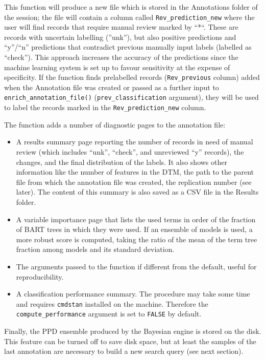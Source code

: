 \documentclass[
]{article}
\providecommand{\tightlist}{%
  \setlength{\itemsep}{0pt}\setlength{\parskip}{0pt}}
\begin{document}
This function will produce a new file which is stored in the Annotations
folder of the session; the file will contain a column called
\texttt{Rev\_prediction\_new} where the user will find records that
require manual review marked by ``*``. These are records with uncertain
labelling (''unk''), but also positive predictions and ``y''/``n''
predictions that contradict previous manually input labels (labelled as
``check''). This approach increases the accuracy of the predictions
since the machine learning system is set up to favour sensitivity at the
expense of specificity. If the function finds prelabelled records
(\texttt{Rev\_previous} column) added when the Annotation file was
created or passed as a further input to
\texttt{enrich\_annotation\_file()} (\texttt{prev\_classification}
argument), they will be used to label the records marked in the
\texttt{Rev\_prediction\_new} column.

The function adds a number of diagnostic pages to the annotation file:

\begin{itemize}
\tightlist
\item
  A results summary page reporting the number of records in need of
  manual review (which includes ``unk'', ``check'', and unreviewed ``y''
  records), the changes, and the final distribution of the labels. It
  also shows other information like the number of features in the DTM,
  the path to the parent file from which the annotation file was
  created, the replication number (see later). The content of this
  summary is also saved as a CSV file in the Results folder.
\item
  A variable importance page that lists the used terms in order of the
  fraction of BART trees in which they were used. If an ensemble of
  models is used, a more robust score is computed, taking the ratio of
  the mean of the term tree fraction among models and its standard
  deviation.
\item
  The arguments passed to the function if different from the default,
  useful for reproducibility.
\item
  A classification performance summary. The procedure may take some time
  and requires \texttt{cmdstan} installed on the machine. Therefore the
  \texttt{compute\_performance} argument is set to \texttt{FALSE} by
  default.
\end{itemize}

Finally, the PPD ensemble produced by the Bayesian engine is stored on
the disk. This feature can be turned off to save disk space, but at
least the samples of the last annotation are necessary to build a new
search query (see next section).
\end{document}
